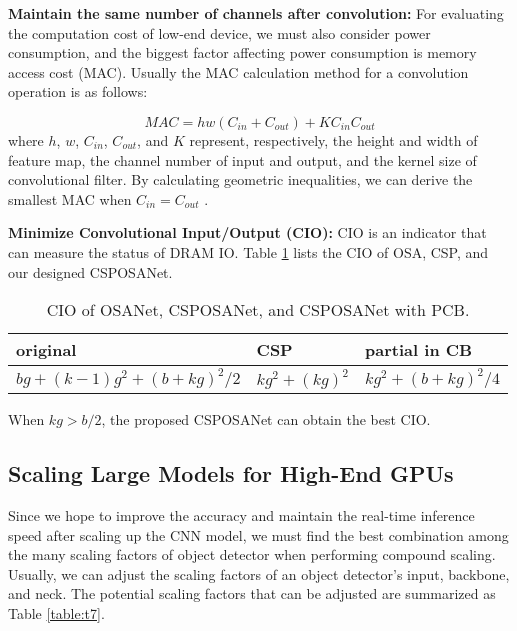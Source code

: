 \documentclass[10pt,twocolumn,letterpaper]{article}
\begin{document}
\noindent
\textbf{Maintain the same number of channels after convolution:} For evaluating the computation cost of low-end device, we must also consider power consumption, and the biggest factor affecting power consumption is memory access cost (MAC).  Usually the MAC calculation method for a convolution operation is as follows:

\begin{equation}
MAC = hw({C}_{in}+{C}_{out})+K{C}_{in}{C}_{out}
\end{equation}
where $h$, $w$, ${C}_{in}$, ${C}_{out}$, and $K$ represent, respectively, the height and width of feature map, the channel number of input and output, and the kernel size of convolutional filter.  By calculating geometric inequalities, we can derive the smallest MAC when ${C}_{in}={C}_{out}$ \cite{ma2018shufflenetv2}.

\noindent
\textbf{Minimize Convolutional Input/Output (CIO):} CIO \cite{chao2019hardnet} is an indicator that can measure the status of DRAM IO.  Table \ref{table:t6} lists the CIO of OSA, CSP, and our designed CSPOSANet.

\begin{table}[h]
	\centering
	\begin{threeparttable}[h]
		\footnotesize
		\caption{CIO of OSANet, CSPOSANet, and CSPOSANet with PCB.}
		\label{table:t6}
		\setlength\tabcolsep{3.5pt}
		\begin{tabular}{lll}
			\toprule
			\textbf{original} & \textbf{CSP} & \textbf{partial in CB} \\				
			\midrule
			$bg + (k-1){g}^{2} + {(b+kg)}^{2}/2$ & $k{g}^{2} + {(kg)}^{2}$ & $k{g}^{2} + {(b+kg)}^{2}/4$ \\
			\bottomrule
		\end{tabular}
	\end{threeparttable}
\end{table}

When $kg > b/2$, the proposed CSPOSANet can obtain the best CIO.

\subsection{Scaling Large Models for High-End GPUs}
\label{ss:lp}

Since we hope to improve the accuracy and maintain the real-time inference speed after scaling up the CNN model, we must find the best combination among the many scaling factors of object detector when performing compound scaling.  Usually, we can adjust the scaling factors of an object detector’s input, backbone, and neck.  The potential scaling factors that can be adjusted are summarized as Table \ref{table:t7}.
\end{document}
